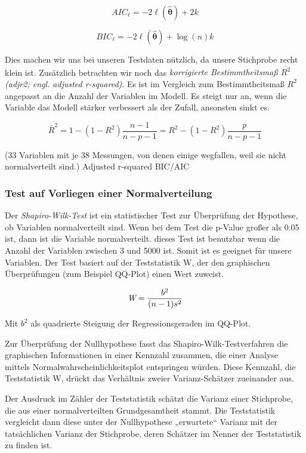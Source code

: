 $$\displaystyle AIC_{\ell }=-2\ell (\mathbf {\hat {\theta }} )+2k$$

$$\displaystyle BIC_{\ell }=-2\ell (\mathbf {\hat {\theta }} )+\log(n)k$$

Dies machen wir uns bei unseren Testdaten nützlich, da unsere Stichprobe recht klein ist. Zusätzlich betrachten wir noch das \emph{korrigierte Bestimmtheitsmaß  $\bar{R^2}$ (adjr2; engl. \it{adjusted r-squared})}. Es ist im Vergleich zum Bestimmtheitsmaß $R^2$ angepasst an die Anzahl der Variablen im Modell. Es steigt nur an, wenn die Variable das Modell stärker verbessert als der Zufall, ansonsten sinkt es.

$$\bar R^2 = 1- (1-R^2) \frac{n-1}{n-p-1} = R^2 - (1-R^2) \frac{p}{n-p-1}$$

(33 Variablen mit je 38 Messungen, von denen einige wegfallen, weil sie nicht normalverteilt sind.)
Adjusted r-squared
BIC/AIC

\subsubsection{Test auf Vorliegen einer Normalverteilung}

Der \emph{Shapiro-Wilk-Test} ist ein statistischer Test zur Überprüfung der Hypothese, ob Variablen normalverteilt sind. Wenn bei dem Test die p-Value großer als 0.05 ist, dann ist die Variable normalverteilt.
dieses Test ist benutzbar wenn die Anzahl der Variablen zwischen 3 und 5000 ist. Somit ist es geeignet für unsere Variablen. Der Test basiert auf der Teststatistik W, der den graphischen Überprüfungen (zum Beispiel QQ-Plot) einen Wert zuweist.

$$\textit{W} = {{b^2}\over {(n-1)s^2}}$$

\cite{2012shapiro}

Mit $b^2$ als quadrierte Steigung der Regressionsgeraden im QQ-Plot.

Zur Überprüfung der Nullhypothese fasst das Shapiro-Wilk-Testverfahren die graphischen Informationen in einer Kennzahl zusammen, die einer Analyse mittels Normalwahrscheinlichkeitsplot entspringen würden. Diese Kennzahl, die Teststatistik W, drückt das Verhältnis zweier Varianz-Schätzer zueinander aus.


Der Ausdruck im Zähler der Teststatistik schätzt die Varianz einer Stichprobe, die aus einer normalverteilten Grundgesamtheit stammt. Die Teststatistik vergleicht dann diese unter der Nullhypothese „erwartete“ Varianz mit der tatsächlichen Varianz der Stichprobe, deren Schätzer im Nenner der Teststatistik zu finden ist. 

